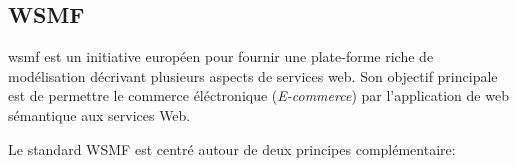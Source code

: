 

    \subsection{WSMF}
    \label{sec:wsmf}    
    \acrshort{wsmf} \cite{fensel2002web}est un initiative européen
    pour fournir une plate-forme riche de modélisation décrivant
    plusieurs aspects de services web. Son objectif principale est de
    permettre le commerce éléctronique (\emph{E-commerce}) par
    l'application de web sémantique aux services Web.

    Le standard \textsc{WSMF} est centré autour de deux principes
    complémentaire:
    


